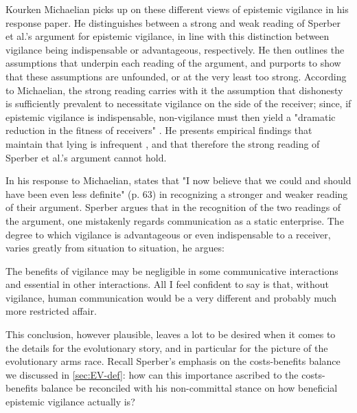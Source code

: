 Kourken Michaelian picks up on these different views of epistemic vigilance in his \citeyear{Michaelian13} response paper. He distinguishes between a strong and weak reading of Sperber et al.'s argument for epistemic vigilance, in line with this distinction between vigilance being indispensable or advantageous, respectively.
He then outlines the assumptions that underpin each reading of the argument, and purports to show that these assumptions are unfounded, or at the very least too strong.
According to Michaelian, the strong reading carries with it the assumption that dishonesty is sufficiently prevalent to necessitate vigilance on the side of the receiver; since, if epistemic vigilance is indispensable, non-vigilance must then yield a "dramatic reduction in the fitness of receivers" \citep[p.~39]{Michaelian13}. He presents empirical findings that maintain that lying is infrequent \citep{Serota10}, and that therefore the strong reading of Sperber et al.'s argument cannot hold.

In his response to Michaelian, \citet{Sperber13} states that "I now believe that we could and should have been even less definite" (p. 63) in recognizing a stronger and weaker reading of their argument. Sperber argues that in the recognition of the two readings of the argument, one mistakenly regards communication as a static enterprise. The degree to which vigilance is advantageous or even indispensable to a receiver, varies greatly from situation to situation, he argues:
\begin{quoting}
    The benefits of vigilance may be negligible in some communicative interactions and essential in other interactions. All I feel confident to say is that, without vigilance, human communication would be a very different and probably much more restricted affair.
    \hfill \citep[p.~63]{Sperber13}
\end{quoting}
This conclusion, however plausible, leaves a lot to be desired when it comes to the details for the evolutionary story, and in particular for the picture of the evolutionary arms race.
Recall Sperber's emphasis on the costs-benefits balance we discussed in \cref{sec:EV-def}: how can this importance ascribed to the costs-benefits balance be reconciled with his non-committal stance on how beneficial epistemic vigilance actually is?

